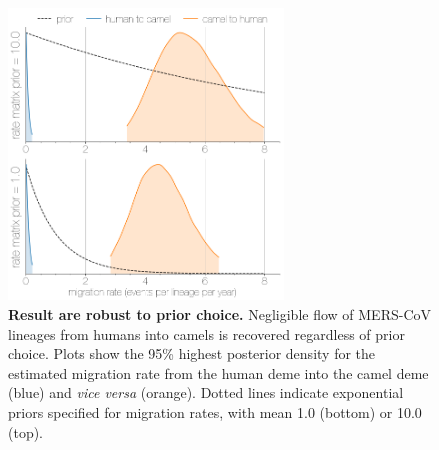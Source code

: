 \documentclass[11pt,oneside,letterpaper]{article}
\def\tbc#1{\textcolor{purple}{[#1]}}
\begin{document}
\begin{figure}[h]
\centering
	\includegraphics[width=0.65\textwidth]{figures/mers_prior.png}
	\caption{\textbf{Result are robust to prior choice.}
Negligible flow of MERS-CoV lineages from humans into camels is recovered regardless of prior choice.
Plots show the 95\% highest posterior density for the estimated migration rate from the human deme into the camel deme (blue) and \textit{vice versa} (orange).
Dotted lines indicate exponential priors specified for migration rates, with mean 1.0 (bottom) or 10.0 (top).
	}
	\label{prior}
\end{figure}
\end{document}
